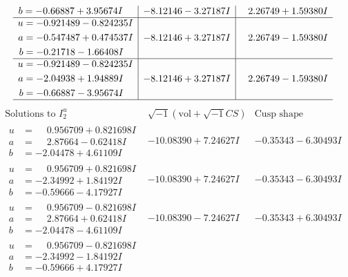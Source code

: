 \documentclass[1p]{elsarticle_modified}
\theoremstyle{definition}
\newcommand{\I}{\sqrt{-1}}
\begin{document}
$$\begin{array}{c|c|c}
\begin{aligned}
b &= -0.66887 + 3.95674 I\end{aligned}
 & -8.12146 - 3.27187 I & \phantom{-}2.26749 + 1.59380 I \\ \hline\begin{aligned}
u &= -0.921489 - 0.824235 I \\
a &= -0.547487 + 0.474537 I \\
b &= -0.21718 - 1.66408 I\end{aligned}
 & -8.12146 + 3.27187 I & \phantom{-}2.26749 - 1.59380 I \\ \hline\begin{aligned}
u &= -0.921489 - 0.824235 I \\
a &= -2.04938 + 1.94889 I \\
b &= -0.66887 - 3.95674 I\end{aligned}
 & -8.12146 + 3.27187 I & \phantom{-}2.26749 - 1.59380 I\\
 \hline 
 \end{array}$$\newpage$$\begin{array}{c|c|c}  
\text{Solutions to }I^u_{2}& \I (\text{vol} + \sqrt{-1}CS) & \text{Cusp shape}\\
 \hline 
\begin{aligned}
u &= \phantom{-}0.956709 + 0.821698 I \\
a &= \phantom{-}2.87664 - 0.62418 I \\
b &= -2.04478 + 4.61109 I\end{aligned}
 & -10.08390 + 7.24627 I & -0.35343 - 6.30493 I \\ \hline\begin{aligned}
u &= \phantom{-}0.956709 + 0.821698 I \\
a &= -2.34992 + 1.84192 I \\
b &= -0.59666 - 4.17927 I\end{aligned}
 & -10.08390 + 7.24627 I & -0.35343 - 6.30493 I \\ \hline\begin{aligned}
u &= \phantom{-}0.956709 - 0.821698 I \\
a &= \phantom{-}2.87664 + 0.62418 I \\
b &= -2.04478 - 4.61109 I\end{aligned}
 & -10.08390 - 7.24627 I & -0.35343 + 6.30493 I \\ \hline\begin{aligned}
u &= \phantom{-}0.956709 - 0.821698 I \\
a &= -2.34992 - 1.84192 I \\
b &= -0.59666 + 4.17927 I\end{aligned}

\end{array}$$
\end{document}
